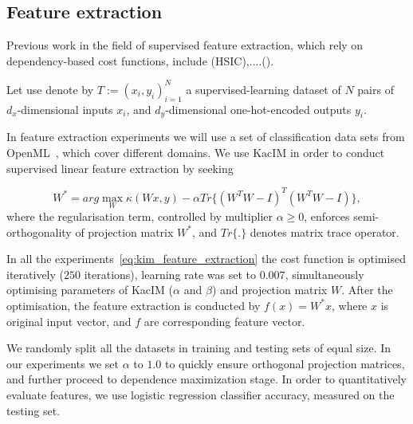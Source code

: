 \documentclass{article}
\newcommand{\KacIM}{\mathrm{KacIM}}
\begin{document}
{\subsection{Feature extraction}

Previous work in the field of supervised feature extraction, which rely on dependency-based cost functions, include \cite{EigenHSIC,HSCA,10.1145/1839490.1839495} (HSIC),....().



Let use denote by $T := (x_{i},y_{i})_{i=1}^{N}$ a supervised-learning dataset of $N$ pairs of $d_{x}$-dimensional inputs $x_{i}$, and $d_{y}$-dimensional one-hot-encoded outputs $y_{i}$.

In feature extraction experiments we will use a set of classification data sets from OpenML~\cite{OpenML2013}, which cover different domains.  We use $\KacIM$ in order to conduct supervised linear feature extraction by seeking 

\begin{equation}
\label{eq:kim_feature_extraction}    
W^{*} = arg \max_{W} \kappa(Wx, y) - \alpha Tr\{(W^{T}W-I)^{T}(W^{T}W-I) \},
\end{equation}
where the regularisation term, controlled by multiplier $\alpha \geq 0$, enforces semi-orthogonality of projection matrix $W^{*}$, and $Tr\{.\}$ denotes matrix trace operator.


In all the experiments~\eqref{eq:kim_feature_extraction} the cost function is optimised iteratively ($250$ iterations), learning rate was set to $0.007$, simultaneously optimising parameters of KacIM ($\alpha$ and $\beta$) and projection matrix $W$.
After the optimisation, the feature extraction is conducted by $f(x) = W^{*}x$, where $x$ is original input vector, and $f$ are corresponding feature vector. 



We randomly split all the datasets in training and testing sets of equal size. %
In our experiments we set $\alpha$ to $1.0$ to quickly ensure orthogonal projection matrices, and further proceed to dependence maximization stage. In order to quantitatively evaluate features, we use logistic regression classifier accuracy, measured on the testing set.


}
\end{document}

